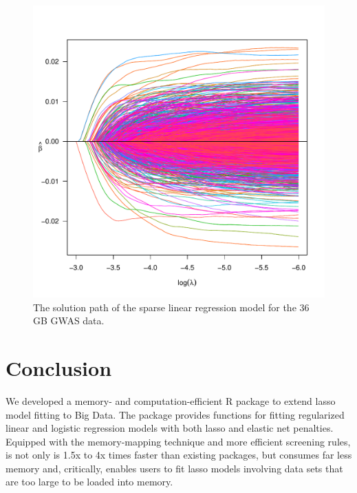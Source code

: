 \begin{figure}[ht]
\centering
\includegraphics[scale=0.7]{Figures/Simulated-GWAS-solution-path-linear.pdf}
\caption{The solution path of the sparse linear regression model for the 36 GB GWAS data.}
\label{big_data_linear}
\end{figure}


\section{Conclusion}

We developed a memory- and computation-efficient R package  to extend lasso model fitting to Big Data.
The package provides functions for fitting regularized linear and logistic regression models with both lasso and elastic net penalties.
Equipped with the memory-mapping technique and more efficient screening rules,  is not only is 1.5x to 4x times faster than existing packages, but consumes far less memory and, critically, enables users to fit lasso models involving data sets that are too large to be loaded into memory.



\address{Yaohui Zeng\\
  Department of Biostatistics\\
  University of Iowa\\
  N301 CPHB 145 North Riverside Drive\\
  Iowa City, IA 52242, United States of America\\
  Email: }

\address{Patrick Breheny\\
  Department of Biostatistics\\
  University of Iowa\\
  N336 CPHB 145 North Riverside Drive\\
  Iowa City, IA 52242, United States of America\\
  E-mail: \\
  URL: \url{http://myweb.uiowa.edu/pbreheny/index.html}}
